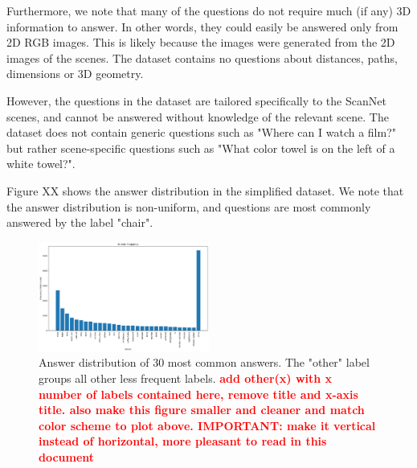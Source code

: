 Furthermore, we note that many of the questions do not require much (if any) 3D information to answer. In other words, they could easily be answered only from 2D RGB images. This is likely because the images were generated from the 2D images of the scenes. The dataset contains no questions about distances, paths, dimensions or 3D geometry. 

However, the questions in the dataset are tailored specifically to the ScanNet scenes, and cannot be answered without knowledge of the relevant scene. The dataset does not contain generic questions such as "Where can I watch a film?" but rather scene-specific questions such as "What color towel is on the left of a white towel?".

Figure XX shows the answer distribution in the simplified dataset. We note that the answer distribution is non-uniform, and questions are most commonly answered by the label "chair". 

\begin{figure}[h!]
    \centering
    \includegraphics[width=0.5\textwidth]{images/answer_frequency.png}
    \caption{Answer distribution of 30 most common answers. The "other" label groups all other less frequent labels. \textcolor{red}{\textbf{add other(x) with x number of labels contained here, remove title and x-axis title. also make this figure smaller and cleaner and match color scheme to plot above. IMPORTANT: make it vertical instead of horizontal, more pleasant to read in this document}}}
    \label{fig:your_label}
\end{figure}